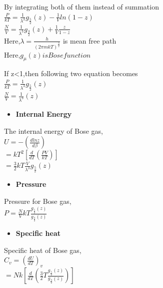 \documentclass{article}
\newcommand*{\1}{\hspace{1pt}}
\begin{document}
By integrating both of them instead of summation\\

$\frac{P}{kT}=\frac{1}{\lambda^3}g_\frac{5}{2}(z)-\frac{1}{V}ln(1-z)$\\

$\frac{N}{V}=\frac{1}{\lambda^3}g_\frac{3}{2}(z)+\frac{1}{V}\frac{z}{1-z}$\\

Here,$\lambda=\frac{h}{(2\pi mkT)^{\frac{3}{2}}}$ is mean free path\\

Here,$g_\mu(z) is Bose function $

If z<1,then following two equation becomes \\

$\frac{P}{kT}=\frac{1}{\lambda^3}g_\frac{5}{2}(z)$\\

$\frac{N}{V}=\frac{1}{\lambda^3}(z)$
\begin{itemize}
    \item \textbf{Internal Energy}
\end{itemize}

The internal energy of Bose gas,\\

$U=-(\frac{dlnz}{d\beta})$\\

$ = kT^2[\frac{d}{dT}(\frac{PV}{kT})]$\\

$ = \frac{3}{2}kT\frac{V}{\lambda^3}g_\frac{5}{2}(z)$\\

\begin{itemize}
    \item \textbf{Pressure}
\end{itemize}

Pressure for Bose gas,\\

$P=\frac{N}{V}kT\frac{g_\frac{5}{2}(z)}{g_\frac{3}{2}(z)}$\\


\begin{itemize}
    \item \textbf{Specific heat }
\end{itemize}

Specific heat of Bose gas,\\


$C_v=(\frac{dU}{dT})_v$\\

$ = Nk[\frac{d}{dT}(\frac{3}{2}T\frac{g_\frac{5}{2}(z)}{g_\frac{3}{2}(z)})]$\\
\end{document}
